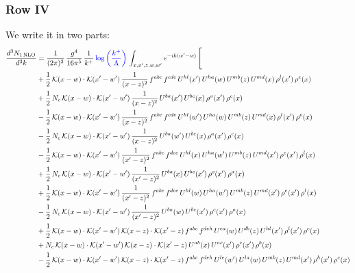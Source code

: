 \documentclass[9pt]{article}
\numberwithin{equation}{section}
\begin{document}
\subsubsection{Row IV}
We write it in two parts: 
\begin{align}
\frac{d^{3}N_{1\,\mathrm{NLO}}}{d^{3}k} & = \frac{1}{(2\pi)^{3}}\,\frac{g^{4}}{16\pi^{5}}\,\frac{1}{k^{+}}\,{\color{blue}\log{\left(\frac{k^{+}}{\Lambda}\right)}}\,\int_{x,x',z,w,w'}e^{-ik(w'-w)}\,\Bigg[\notag\\ & 
 +\frac{1}{2}\,\mathcal{K}(x-w)\cdot\mathcal{K}(x'-w')\,\frac{1}{(x-z)^{2}}\,f^{abc}\,f^{cde}\,U^{hl}(x')\,U^{ha}(w)\,U^{mb}(z)\,U^{md}(x)\,\rho^{l}(x')\,\rho^{e}(x)\notag\\
& +\frac{1}{2}\,N_{c}\,\mathcal{K}(x-w)\cdot\mathcal{K}(x'-w')\,\frac{1}{(x-z)^{2}}\,U^{ba}(x')\,U^{bc}(x)\,\rho^{a}(x')\,\rho^{c}(x)\notag\\
& -\frac{1}{2}\,\mathcal{K}(x-w)\cdot\mathcal{K}(x'-w')\,\frac{1}{(x-z)^{2}}\,f^{abc}\,f^{cde}\,U^{hl}(w')\,U^{ha}(w)\,U^{mb}(z)\,U^{md}(x)\,\rho^{l}(x')\,\rho^{e}(x)\notag\\
& -\frac{1}{2}\,N_{c}\,\mathcal{K}(x-w)\cdot\mathcal{K}(x'-w')\,\frac{1}{(x-z)^{2}}\,U^{ba}(w')\,U^{bc}(x)\,\rho^{a}(x')\,\rho^{c}(x)\notag\\
& -\frac{1}{2}\,\mathcal{K}(x-w)\cdot\mathcal{K}(x'-w')\,\frac{1}{(x'-z)^{2}}\,f^{abc}\,f^{dce}\,U^{hl}(x)\,U^{ha}(w')\,U^{mb}(z)\,U^{md}(x')\,\rho^{e}(x')\,\rho^{l}(x)\notag\\
& +\frac{1}{2}\,N_{c}\,\mathcal{K}(x-w)\cdot\mathcal{K}(x'-w')\,\frac{1}{(x'-z)^{2}}\,U^{ba}(x)\,U^{bc}(x')\,\rho^{c}(x')\,\rho^{a}(x)\notag\\
& +\frac{1}{2}\,\mathcal{K}(x-w)\cdot\mathcal{K}(x'-w')\,\frac{1}{(x'-z)^{2}}\,f^{abc}\,f^{dce}\,U^{hl}(w)\,U^{ha}(w')\,U^{mb}(z)\,U^{md}(x')\,\rho^{e}(x')\,\rho^{l}(x)\notag\\
& -\frac{1}{2}\,N_{c}\,\mathcal{K}(x-w)\cdot\mathcal{K}(x'-w')\,\frac{1}{(x'-z)^{2}}\,U^{ba}(w)\,U^{bc}(x')\,\rho^{c}(x')\,\rho^{a}(x)\notag\\
& +\frac{1}{2}\,\mathcal{K}(x-w)\cdot\mathcal{K}(x'-w')\,\mathcal{K}(x-z)\cdot\mathcal{K}(x'-z)\,f^{abc}\,f^{deh}\,U^{ea}(w)\,U^{db}(z)\,U^{hl}(x')\,\rho^{l}(x')\,\rho^{c}(x)\notag\\
& +N_{c}\,\mathcal{K}(x-w)\cdot\mathcal{K}(x'-w')\,\mathcal{K}(x-z)\cdot\mathcal{K}(x'-z)\,U^{ab}(x)\,U^{ac}(x')\,\rho^{c}(x')\,\rho^{b}(x)\notag\\
& -\frac{1}{2}\,\mathcal{K}(x-w)\cdot\mathcal{K}(x'-w')\,\mathcal{K}(x-z)\cdot\mathcal{K}(x'-z)\,f^{abc}\,f^{deh}\,U^{le}(w')\,U^{la}(w)\,U^{mb}(z)\,U^{md}(x')\,\rho^{h}(x')\,\rho^{c}(x)\notag\\

\end{align}
\end{document}
